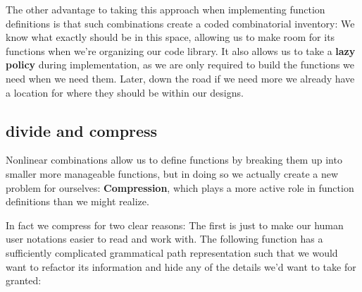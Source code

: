 \documentclass[twoside]{article}
\newcommand{\strong}[1]{{\bfseries #1}}
\begin{document}
The other advantage to taking this approach when implementing function definitions is that such combinations create
a coded combinatorial inventory: We know what exactly should be in this space, allowing us to make room for its functions
when we're organizing our code library. It also allows us to take a \strong{lazy policy} during implementation,
as we are only required to build the functions we need when we need them. Later, down the road if we need more
we already have a location for where they should be within our designs.

\subsection*{divide and compress}

Nonlinear combinations allow us to define functions by breaking them up into smaller more manageable functions,
but in doing so we actually create a new problem for ourselves: \strong{Compression}, which plays a more active
role in function definitions than we might realize.

In fact we compress for two clear reasons: The first is just to make our human user notations easier to read and work with.
The following function has a sufficiently complicated grammatical path representation such that we would want to refactor
its information and hide any of the details we'd want to take for granted:
\end{document}
